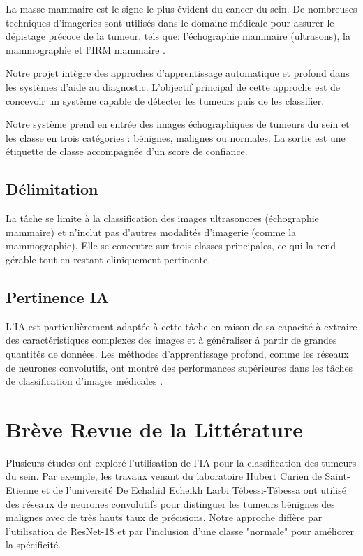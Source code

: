 \documentclass[a4paper,12pt]{article}
\begin{document}
La masse mammaire est le signe le plus évident du cancer du sein. De nombreuses techniques d'imageries sont utilisés dans le domaine médicale pour assurer le dépistage précoce de la tumeur, tels que: l'échographie mammaire (ultrasons), la mammographie et l'IRM mammaire \cite{soltani2025detection}.

Notre projet intègre des approches d'apprentissage automatique et profond dans les systèmes d'aide au diagnostic. L'objectif principal de cette approche est de concevoir un système capable de détecter les tumeurs puis de les classifier.

Notre système prend en entrée des images échographiques de tumeurs du sein et les classe en trois catégories : bénignes, malignes ou normales. La sortie est une étiquette de classe accompagnée d'un score de confiance.

\subsection{Délimitation}
La tâche se limite à la classification des images ultrasonores (échographie mammaire) et n'inclut pas d'autres modalités d'imagerie (comme la mammographie). Elle se concentre sur trois classes principales, ce qui la rend gérable tout en restant cliniquement pertinente.

\subsection{Pertinence IA}
L'IA est particulièrement adaptée à cette tâche en raison de sa capacité à extraire des caractéristiques complexes des images et à généraliser à partir de grandes quantités de données. Les méthodes d'apprentissage profond, comme les réseaux de neurones convolutifs, ont montré des performances supérieures dans les tâches de classification d'images médicales \cite{mayouf2021preparation}.

\section{Brève Revue de la Littérature}

Plusieurs études ont exploré l'utilisation de l'IA pour la classification des tumeurs du sein. Par exemple, les travaux venant du laboratoire Hubert Curien de Saint-Etienne\cite{mayouf2021preparation} et de l'université De Echahid Echeikh Larbi Tébessi-Tébessa \cite{soltani2025detection} ont utilisé des réseaux de neurones convolutifs pour distinguer les tumeurs bénignes des malignes avec de très hauts taux de précisions. Notre approche diffère par l'utilisation de ResNet-18 et par l'inclusion d'une classe "normale" pour améliorer la spécificité.
\end{document}

